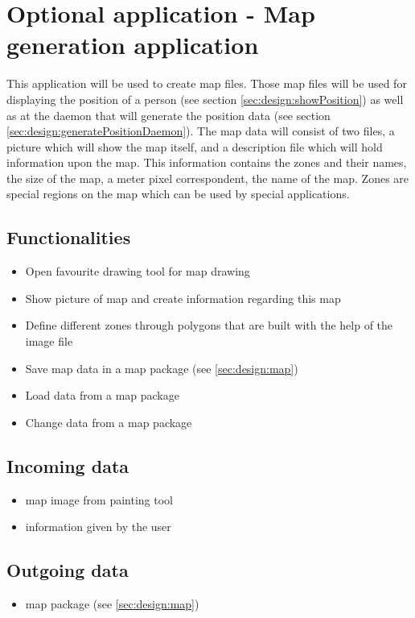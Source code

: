   \section{Optional application - Map generation application}
   \label{sec:design:createMapAppl}
   This application will be used to create map files. Those map files will be used for displaying the position of a person (see section \ref{sec:design:showPosition}) as well as at the daemon that will generate the position data (see section \ref{sec:design:generatePositionDaemon}). The map data will consist of two files, a picture which will show the map itself, and a description file which will hold information upon the map. This information contains the zones and their names, the size of the map, a meter pixel correspondent, the name of the map. Zones are special regions on the map which can be used by special applications.

   \subsection{Functionalities}
    \begin{itemize}
     \item Open favourite drawing tool for map drawing
     \item Show picture of map and create information regarding this map
     \item Define different zones through polygons that are built with the help of the image file
     \item Save map data in a map package (see \ref{sec:design:map})
     \item Load data from a map package
     \item Change data from a map package
    \end{itemize}

   \subsection{Incoming data}
    \begin{itemize}
     \item map image from painting tool
     \item information given by the user
    \end{itemize}

   \subsection{Outgoing data}
    \begin{itemize}
     \item map package (see \ref{sec:design:map})
    \end{itemize}

